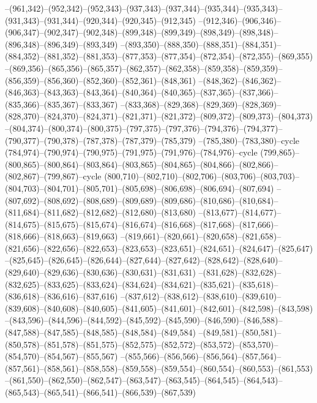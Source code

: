 --(961,342)--(952,342)--(952,343)--(937,343)--(937,344)--(935,344)--(935,343)--(931,343)--(931,344)--(920,344)--(920,345)--(912,345)
--(912,346)--(906,346)--(906,347)--(902,347)--(902,348)--(899,348)--(899,349)--(898,349)--(898,348)--(896,348)--(896,349)--(893,349)
--(893,350)--(888,350)--(888,351)--(884,351)--(884,352)--(881,352)--(881,353)--(877,353)--(877,354)--(872,354)--(872,355)--(869,355)
--(869,356)--(865,356)--(865,357)--(862,357)--(862,358)--(859,358)--(859,359)--(856,359)--(856,360)--(852,360)--(852,361)--(848,361)
--(848,362)--(846,362)--(846,363)--(843,363)--(843,364)--(840,364)--(840,365)--(837,365)--(837,366)--(835,366)--(835,367)--(833,367)
--(833,368)--(829,368)--(829,369)--(828,369)--(828,370)--(824,370)--(824,371)--(821,371)--(821,372)--(809,372)--(809,373)--(804,373)
--(804,374)--(800,374)--(800,375)--(797,375)--(797,376)--(794,376)--(794,377)--(790,377)--(790,378)--(787,378)--(787,379)--(785,379)
--(785,380)--(783,380)--cycle
(784,974)--(790,974)--(790,975)--(791,975)--(791,976)--(784,976)--cycle
(799,865)--(800,865)--(800,864)--(803,864)--(803,865)--(804,865)--(804,866)--(802,866)--(802,867)--(799,867)--cycle
(800,710)--(802,710)--(802,706)--(803,706)--(803,703)--(804,703)--(804,701)--(805,701)--(805,698)--(806,698)--(806,694)--(807,694)
--(807,692)--(808,692)--(808,689)--(809,689)--(809,686)--(810,686)--(810,684)--(811,684)--(811,682)--(812,682)--(812,680)--(813,680)
--(813,677)--(814,677)--(814,675)--(815,675)--(815,674)--(816,674)--(816,668)--(817,668)--(817,666)--(818,666)--(818,663)--(819,663)
--(819,661)--(820,661)--(820,658)--(821,658)--(821,656)--(822,656)--(822,653)--(823,653)--(823,651)--(824,651)--(824,647)--(825,647)
--(825,645)--(826,645)--(826,644)--(827,644)--(827,642)--(828,642)--(828,640)--(829,640)--(829,636)--(830,636)--(830,631)--(831,631)
--(831,628)--(832,628)--(832,625)--(833,625)--(833,624)--(834,624)--(834,621)--(835,621)--(835,618)--(836,618)--(836,616)--(837,616)
--(837,612)--(838,612)--(838,610)--(839,610)--(839,608)--(840,608)--(840,605)--(841,605)--(841,601)--(842,601)--(842,598)--(843,598)
--(843,596)--(844,596)--(844,592)--(845,592)--(845,590)--(846,590)--(846,588)--(847,588)--(847,585)--(848,585)--(848,584)--(849,584)
--(849,581)--(850,581)--(850,578)--(851,578)--(851,575)--(852,575)--(852,572)--(853,572)--(853,570)--(854,570)--(854,567)--(855,567)
--(855,566)--(856,566)--(856,564)--(857,564)--(857,561)--(858,561)--(858,558)--(859,558)--(859,554)--(860,554)--(860,553)--(861,553)
--(861,550)--(862,550)--(862,547)--(863,547)--(863,545)--(864,545)--(864,543)--(865,543)--(865,541)--(866,541)--(866,539)--(867,539)
